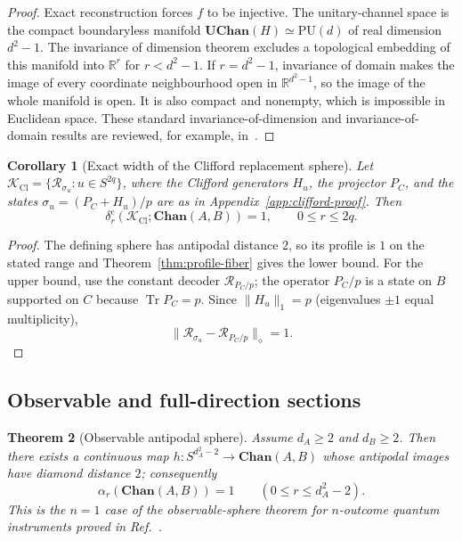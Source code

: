 \documentclass[11pt,a4paper]{article}
\theoremstyle{definition}
\theoremstyle{plain}
\newtheorem{theorem}{Theorem}[section]
\newtheorem{corollary}[theorem]{Corollary}
\theoremstyle{remark}
\DeclareMathOperator{\Tr}{Tr}
\newcommand{\Chan}{\mathbf{Chan}}
\newcommand{\UChan}{\mathbf{UChan}}
\begin{document}
\begin{proof}
Exact reconstruction forces $f$ to be injective. The unitary-channel space
is the compact boundaryless manifold
$\UChan(H)\simeq\mathrm{PU}(d)$ of real dimension $d^2-1$. The invariance
of dimension theorem excludes a topological embedding of this manifold into
$\mathbb R^r$ for $r<d^2-1$. If $r=d^2-1$, invariance of domain makes the
image of every coordinate
neighbourhood open in $\mathbb R^{d^2-1}$, so the image of the whole manifold
is open. It is also compact and nonempty, which is impossible in Euclidean
space. These standard invariance-of-dimension and invariance-of-domain
results are reviewed, for example, in~\cite{Munkres2000}.
\end{proof}

\begin{corollary}[Exact width of the Clifford replacement sphere]
\label{cor:clifford-exact}
Let $\mathcal K_{\mathrm{Cl}}=
\{\mathcal R_{\sigma_u}:u\in S^{2q}\}$, where the Clifford generators $H_u$,
the projector $P_C$, and the states $\sigma_u=(P_C+H_u)/p$ are as in
Appendix~\ref{app:clifford-proof}. Then
\[
\delta_r^{\mathrm c}(\mathcal K_{\mathrm{Cl}};\Chan(A,B))=1,
\qquad0\leq r\leq2q.
\]
\end{corollary}

\begin{proof}
The defining sphere has antipodal distance $2$, so its profile is $1$ on
the stated range and Theorem~\ref{thm:profile-fiber} gives the lower bound.
For the upper bound, use the constant decoder $\mathcal R_{P_C/p}$; the
operator $P_C/p$ is a state on $B$ supported on $C$ because $\Tr P_C=p$. Since
$\|H_u\|_1=p$ (eigenvalues $\pm1$ equal multiplicity),
\[
\|\mathcal R_{\sigma_u}-\mathcal R_{P_C/p}\|_\diamond=1.
\]
\end{proof}

\subsection{Observable and full-direction sections}

\begin{theorem}[Observable antipodal sphere]
\label{thm:observable-channel}
Assume $d_A\ge2$ and $d_B\ge2$. Then there exists a continuous map
$h:S^{d_A^2-2}\to\Chan(A,B)$ whose antipodal images have diamond distance
$2$; consequently
\[
\alpha_r(\Chan(A,B))=1\qquad(0\le r\le d_A^2-2).
\]
This is the $n=1$ case of the observable-sphere theorem for $n$-outcome
quantum instruments proved in Ref.~\cite{CompanionInstruments}.
\end{theorem}
\end{document}
